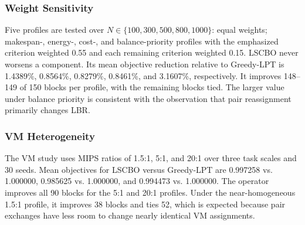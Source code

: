 \documentclass[pdflatex,onecolumn,sn-mathphys-num]{sn-jnl}
\begin{document}
\begin{table}[ht]
\centering
\caption{Canonical cloud ablation (mean over 150 paired blocks)}\label{tab:phase_ablation}
\end{table}

\subsubsection{Weight Sensitivity}\label{sec:weight_sensitivity}
Five profiles are tested over $N\in\{100,300,500,800,1000\}$: equal weights; makespan-, energy-, cost-, and balance-priority profiles with the emphasized criterion weighted 0.55 and each remaining criterion weighted 0.15. LSCBO never worsens a component. Its mean objective reduction relative to Greedy-LPT is 1.4389\%, 0.8564\%, 0.8279\%, 0.8461\%, and 3.1607\%, respectively. It improves 148--149 of 150 blocks per profile, with the remaining blocks tied. The larger value under balance priority is consistent with the observation that pair reassignment primarily changes LBR.

\subsubsection{VM Heterogeneity}\label{sec:vm_heterogeneity}
The VM study uses MIPS ratios of 1.5:1, 5:1, and 20:1 over three task scales and 30 seeds. Mean objectives for LSCBO versus Greedy-LPT are 0.997258 vs. 1.000000, 0.985625 vs. 1.000000, and 0.994473 vs. 1.000000. The operator improves all 90 blocks for the 5:1 and 20:1 profiles. Under the near-homogeneous 1.5:1 profile, it improves 38 blocks and ties 52, which is expected because pair exchanges have less room to change nearly identical VM assignments.
\end{document}
